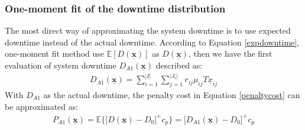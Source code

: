 \documentclass[preprint,12pt]{elsarticle}
\begin{document}
%
\subsubsection{One-moment fit of the downtime distribution}

The most direct way of approximating the system downtime is to use expected downtime instead of the actual downtime. According to Equation \eqref{expdowntime}, one-moment fit method use $\mathbb{E}[D(\boldsymbol{\underline{x}})]$ as $D(\boldsymbol{\underline{x}})$, then we have the first evaluation of system downtime $D_{A1}(\boldsymbol{\underline{x}})$ described as:
\small{
\begin{eqnarray}
D_{A1}(\boldsymbol{\underline{x}}) = \sum^{\lvert I \rvert}_{i=1} \sum_{j=1}^{\lvert J_{i} \rvert}{r_{ij}\mu_{ij}T\underline{x}_{ij}}
\label{approximation1}
\end{eqnarray}
With $D_{A1}$ as the actual downtime, the penalty cost in Equation \eqref{penaltycost} can be approximated as:
\begin{eqnarray}
P_{A1}(\boldsymbol{\underline{x}}) =\mathbb{E}\bigg\{\bigg[D(\boldsymbol{\underline{x}})-D_{0}\bigg]^{+}c_{p}\bigg\} = \bigg[D_{A1}(\boldsymbol{\underline{x}})-D_{0} \bigg]^{+}c_p \label{penapproximation1}
\end{eqnarray}
}
\end{document}
